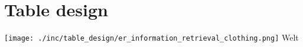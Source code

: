 

\section{Table design}

\texttt{[image: ./inc/table\_design/er\_information\_retrieval\_clothing.png]}
Welt
